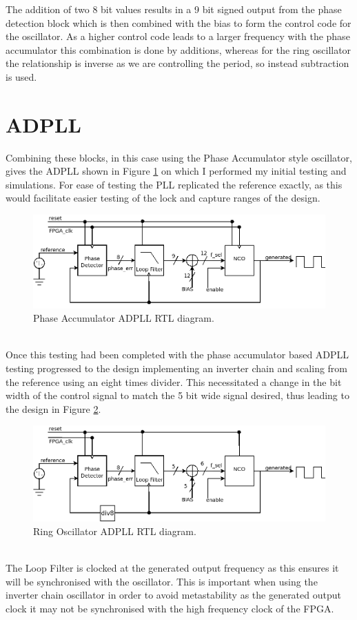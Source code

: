 \documentclass[11pt,english,british]{report}
\begin{document}
The addition of two 8 bit values results in a 9 bit signed output from the phase detection block which is then combined with the bias to form the control code for the oscillator. As a higher control code leads to a larger frequency with the phase accumulator this combination is done by additions, whereas for the ring oscillator the relationship is inverse as we are controlling the period, so instead subtraction is used.

\section{ADPLL}
Combining these blocks, in this case using the Phase Accumulator style oscillator, gives the ADPLL shown in Figure \ref{fig:my_adpll} on which I performed my initial testing and simulations. For ease of testing the PLL replicated the reference exactly, as this would facilitate easier testing of the lock and capture ranges of the design.
\begin{figure}[h]
	\centering
	\includegraphics[scale=0.35]{../rtl}
	\caption{Phase Accumulator ADPLL RTL diagram.}
	\label{fig:my_adpll}
\end{figure}\\
Once this testing had been completed with the phase accumulator based ADPLL testing progressed to the design implementing an inverter chain and scaling from the reference using an eight times divider. This necessitated a change in the bit width of the control signal to match the 5 bit wide signal desired, thus leading to the design in Figure \ref{fig:my_ring_adpll}.
\begin{figure}[h]
	\centering
	\includegraphics[scale=0.35]{../ro_rtl}
	\caption{Ring Oscillator ADPLL RTL diagram.}
	\label{fig:my_ring_adpll}
\end{figure}\\
 The Loop Filter is clocked at the generated output frequency as this ensures it will be synchronised with the oscillator. This is important when using the inverter chain oscillator in order to avoid metastability as the generated output clock it may not be synchronised with the high frequency clock of the FPGA.
\end{document}
